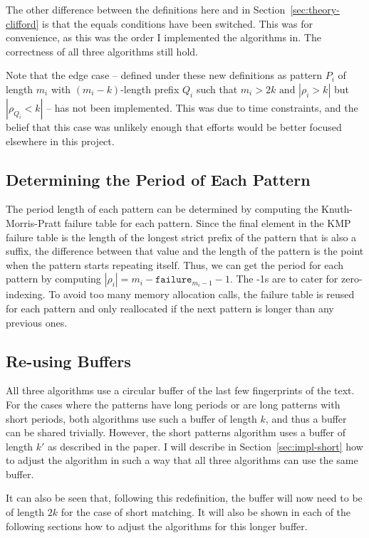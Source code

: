 \documentclass[ %
                    author={Dominic Joseph Moylett},
                    degree={MEng},
                     title={Dictionary Matching with Fingerprints},
                  subtitle={An Empirical Analysis},
                      type={research},
                      year={2015} ]{dissertation}
\begin{document}
The other difference between the definitions here and in Section~\ref{sec:theory-clifford} is that the equals conditions have been switched. This was for convenience, as this was the order I implemented the algorithms in. The correctness of all three algorithms still hold.

Note that the edge case -- defined under these new definitions as pattern $P_i$ of length $m_i$ with $(m_i - k)$-length prefix $Q_i$ such that $m_i > 2k \text{ and } |\rho_i > k|$ but $|\rho_{Q_i} < k|$ -- has not been implemented. This was due to time constraints, and the belief that this case was unlikely enough that efforts would be better focused elsewhere in this project.

\subsection{Determining the Period of Each Pattern}

The period length of each pattern can be determined by computing the Knuth-Morris-Pratt failure table for each pattern. Since the final element in the KMP failure table is the length of the longest strict prefix of the pattern that is also a suffix, the difference between that value and the length of the pattern is the point when the pattern starts repeating itself. Thus, we can get the period for each pattern by computing $|\rho_i| = m_i - \texttt{failure}_{m_i - 1} - 1$. The -1s are to cater for zero-indexing. To avoid too many memory allocation calls, the failure table is reused for each pattern and only reallocated if the next pattern is longer than any previous ones.

\subsection{Re-using Buffers}

All three algorithms use a circular buffer of the last few fingerprints of the text. For the cases where the patterns have long periods or are long patterns with short periods, both algorithms use such a buffer of length $k$, and thus a buffer can be shared trivially. However, the short patterns algorithm uses a buffer of length $k'$ as described in the paper. I will describe in Section~\ref{sec:impl-short} how to adjust the algorithm in such a way that all three algorithms can use the same buffer.

It can also be seen that, following this redefinition, the buffer will now need to be of length $2k$ for the case of short matching. It will also be shown in each of the following sections how to adjust the algorithms for this longer buffer.
\end{document}
